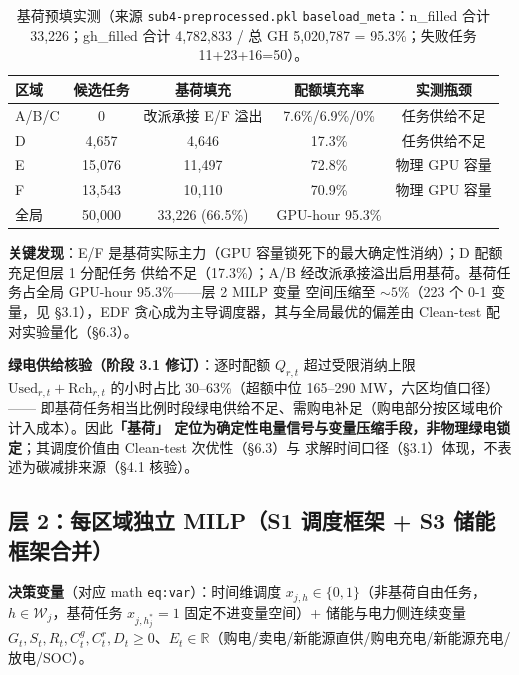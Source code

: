 \documentclass{internal-report}
\begin{document}
\begin{table}[H]
\centering
\footnotesize
\begin{tabular}{lcccc}
\toprule
区域 & 候选任务 & 基荷填充 & 配额填充率 & 实测瓶颈 \\
\midrule
A/B/C & 0 & 改派承接 E/F 溢出 & 7.6\%/6.9\%/0\% & 任务供给不足 \\
D & 4,657 & 4,646 & 17.3\% & 任务供给不足 \\
E & 15,076 & 11,497 & 72.8\% & 物理 GPU 容量 \\
F & 13,543 & 10,110 & 70.9\% & 物理 GPU 容量 \\
\midrule
全局 & 50,000 & 33,226 (66.5\%) & GPU-hour 95.3\% & \\
\bottomrule
\end{tabular}
\caption{基荷预填实测（来源 \texttt{sub4-preprocessed.pkl} \texttt{baseload\_meta}：n\_filled 合计
33,226；gh\_filled 合计 4,782,833 / 总 GH 5,020,787 = 95.3\%；失败任务 11+23+16=50）。}
\label{tab:baseload}
\end{table}

\textbf{关键发现}：E/F 是基荷实际主力（GPU 容量锁死下的最大确定性消纳）；D 配额充足但层 1 分配任务
供给不足（17.3\%）；A/B 经改派承接溢出启用基荷。基荷任务占全局 GPU-hour 95.3\%——层 2 MILP 变量
空间压缩至 $\sim 5\%$（223 个 0-1 变量，见 §3.1），EDF 贪心成为主导调度器，其与全局最优的偏差由
Clean-test 配对实验量化（§6.3）。

\textbf{绿电供给核验（阶段 3.1 修订）}：逐时配额 $Q_{r,t}$ 超过受限消纳上限
$\text{Used}_{r,t}+\text{Rch}_{r,t}$ 的小时占比 30--63\%（超额中位 165--290 MW，六区均值口径）——
即基荷任务相当比例时段绿电供给不足、需购电补足（购电部分按区域电价计入成本）。因此\textbf{「基荷」
定位为确定性电量信号与变量压缩手段，非物理绿电锁定}；其调度价值由 Clean-test 次优性（§6.3）与
求解时间口径（§3.1）体现，不表述为碳减排来源（§4.1 核验）。

\subsection{层 2：每区域独立 MILP（S1 调度框架 + S3 储能框架合并）}
\label{sec:l2}

\textbf{决策变量}（对应 math \texttt{eq:var}）：时间维调度 $x_{j,h}\in\{0,1\}$（非基荷自由任务，
$h\in\mathcal{W}_j$，基荷任务 $x_{j,h_j^*}=1$ 固定不进变量空间）+ 储能与电力侧连续变量
$G_t,S_t,R_t,C^g_t,C^r_t,D_t\ge 0$、$E_t\in\mathbb{R}$（购电/卖电/新能源直供/购电充电/新能源充电/
放电/SOC）。
\end{document}
